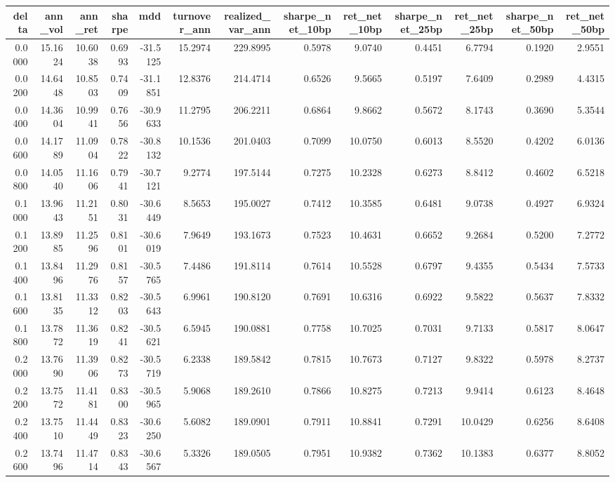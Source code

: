 \begin{tabular}{rrrrrrrrrrrrr}
\toprule
delta & ann_vol & ann_ret & sharpe & mdd & turnover_ann & realized_var_ann & sharpe_net_10bp & ret_net_10bp & sharpe_net_25bp & ret_net_25bp & sharpe_net_50bp & ret_net_50bp \\
\midrule
0.0000 & 15.1624 & 10.6038 & 0.6993 & -31.5125 & 15.2974 & 229.8995 & 0.5978 & 9.0740 & 0.4451 & 6.7794 & 0.1920 & 2.9551 \\
0.0200 & 14.6448 & 10.8503 & 0.7409 & -31.1851 & 12.8376 & 214.4714 & 0.6526 & 9.5665 & 0.5197 & 7.6409 & 0.2989 & 4.4315 \\
0.0400 & 14.3604 & 10.9941 & 0.7656 & -30.9633 & 11.2795 & 206.2211 & 0.6864 & 9.8662 & 0.5672 & 8.1743 & 0.3690 & 5.3544 \\
0.0600 & 14.1789 & 11.0904 & 0.7822 & -30.8132 & 10.1536 & 201.0403 & 0.7099 & 10.0750 & 0.6013 & 8.5520 & 0.4202 & 6.0136 \\
0.0800 & 14.0540 & 11.1606 & 0.7941 & -30.7121 & 9.2774 & 197.5144 & 0.7275 & 10.2328 & 0.6273 & 8.8412 & 0.4602 & 6.5218 \\
0.1000 & 13.9643 & 11.2151 & 0.8031 & -30.6449 & 8.5653 & 195.0027 & 0.7412 & 10.3585 & 0.6481 & 9.0738 & 0.4927 & 6.9324 \\
0.1200 & 13.8985 & 11.2596 & 0.8101 & -30.6019 & 7.9649 & 193.1673 & 0.7523 & 10.4631 & 0.6652 & 9.2684 & 0.5200 & 7.2772 \\
0.1400 & 13.8496 & 11.2976 & 0.8157 & -30.5765 & 7.4486 & 191.8114 & 0.7614 & 10.5528 & 0.6797 & 9.4355 & 0.5434 & 7.5733 \\
0.1600 & 13.8135 & 11.3312 & 0.8203 & -30.5643 & 6.9961 & 190.8120 & 0.7691 & 10.6316 & 0.6922 & 9.5822 & 0.5637 & 7.8332 \\
0.1800 & 13.7872 & 11.3619 & 0.8241 & -30.5621 & 6.5945 & 190.0881 & 0.7758 & 10.7025 & 0.7031 & 9.7133 & 0.5817 & 8.0647 \\
0.2000 & 13.7690 & 11.3906 & 0.8273 & -30.5719 & 6.2338 & 189.5842 & 0.7815 & 10.7673 & 0.7127 & 9.8322 & 0.5978 & 8.2737 \\
0.2200 & 13.7572 & 11.4181 & 0.8300 & -30.5965 & 5.9068 & 189.2610 & 0.7866 & 10.8275 & 0.7213 & 9.9414 & 0.6123 & 8.4648 \\
0.2400 & 13.7510 & 11.4449 & 0.8323 & -30.6250 & 5.6082 & 189.0901 & 0.7911 & 10.8841 & 0.7291 & 10.0429 & 0.6256 & 8.6408 \\
0.2600 & 13.7496 & 11.4714 & 0.8343 & -30.6567 & 5.3326 & 189.0505 & 0.7951 & 10.9382 & 0.7362 & 10.1383 & 0.6377 & 8.8052 \\

\end{tabular}
